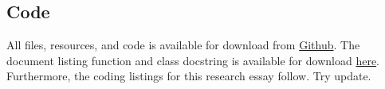 \documentclass[12pt]{article}
\begin{document}
\subsection{Code}
All files, resources, and code is available for download from \href{https://github.com/CMCD1996/finance-honours}{Github}.
The document listing function and class docstring is available for download \href{/Users/connor/Google Drive/Documents/Professional/Projects/Portfolio/downloads/wip.pdf}{here}.
Furthermore, the coding listings for this research essay follow. Try update.
% 
\printbibliography
\newpage
\end{document}
